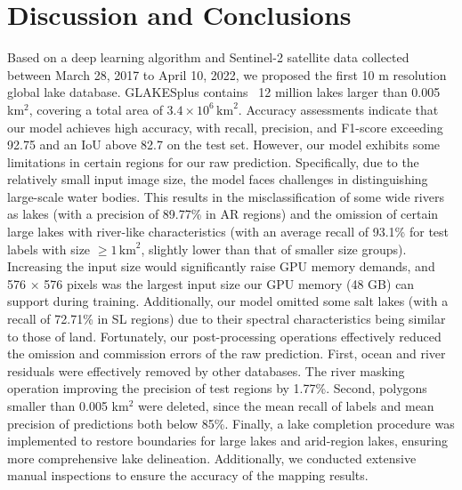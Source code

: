 \documentclass[preprint,12pt,authoryear]{elsarticle}
\begin{document}
\section{Discussion and Conclusions}
\label{sec4}

Based on a deep learning algorithm  and Sentinel-2 satellite data collected between March 28, 2017 to April 10, 2022, we proposed the first 10 m resolution global lake database. GLAKESplus contains ~12 million lakes larger than 0.005 km$^2$, covering a total area of  $3.4 \times 10^6\, \text{km}^2$. Accuracy assessments indicate that our model achieves high accuracy, with recall, precision, and F1-score exceeding 92.75 and an IoU above 82.7 on the test set. 
However, our model exhibits some limitations in certain regions for our raw prediction. Specifically, due to the relatively small input image size, the model faces challenges in distinguishing large-scale water bodies. This results in the misclassification of some wide rivers as lakes (with a precision of 89.77\% in AR regions) and the omission of certain large lakes with river-like characteristics (with an average recall of 93.1\% for test labels with size $\ge 1\, \text{km}^2$, slightly lower than that of smaller size groups). Increasing the input size would significantly raise GPU memory demands, and 576 × 576 pixels was the largest input size our GPU memory (48 GB) can support during training. Additionally, our model omitted some salt lakes (with a recall of 72.71\% in SL regions) due to their spectral characteristics being similar to those of land. Fortunately, our post-processing operations effectively reduced the omission and commission errors of the raw prediction. First, ocean and river residuals were effectively removed by other databases. The river masking operation improving the precision of test regions by 1.77\%. Second, polygons smaller than 0.005 km$^2$ were deleted, since the mean recall of labels and mean precision of predictions both below 85\%. Finally, a lake completion procedure was implemented to restore boundaries for large lakes and arid-region lakes, ensuring more comprehensive lake delineation. Additionally, we conducted extensive manual inspections to ensure the accuracy of the mapping results.
\end{document}
